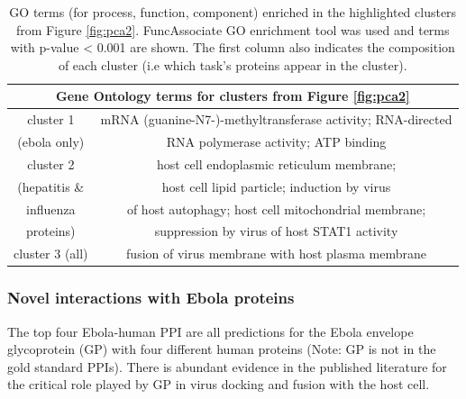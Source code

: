 \documentclass{bioinfo}
\begin{document}
\begin{table}[bht]
\label{goterms}
\begin{scriptsize}
\begin{center}
\begin{tabular}{|c|c|}
\multicolumn{2}{c}{Gene Ontology terms for clusters from Figure \ref{fig:pca2}} \\ \hline
cluster 1 & mRNA (guanine-N7-)-methyltransferase activity; RNA-directed \\
(ebola only)& RNA polymerase activity; ATP binding \\ \hline
cluster 2 & host cell endoplasmic reticulum membrane; \\ 
(hepatitis \& & host cell lipid particle; induction by virus \\
influenza & of host autophagy; host cell mitochondrial membrane; \\
proteins) & suppression by virus of host STAT1 activity \\ \hline
cluster 3 (all) & fusion of virus membrane with host plasma membrane \\ \hline
\end{tabular}
\caption{GO terms (for process, function, component) enriched in the highlighted clusters from Figure \ref{fig:pca2}. FuncAssociate GO enrichment tool was used and terms with p-value < 0.001 are shown. The first column also indicates the composition of each cluster (i.e which task's proteins appear in the cluster).}
\end{center}
\end{scriptsize}
\end{table}

 


\subsubsection{Novel interactions with Ebola proteins}
The top four Ebola-human PPI are all predictions for the Ebola envelope glycoprotein (GP) with four different human proteins (Note: GP is not in the gold standard PPIs). There is abundant evidence in the published literature \citep{nanbo2010} for the critical role played by GP in virus docking and fusion with the host cell.
\end{document}
